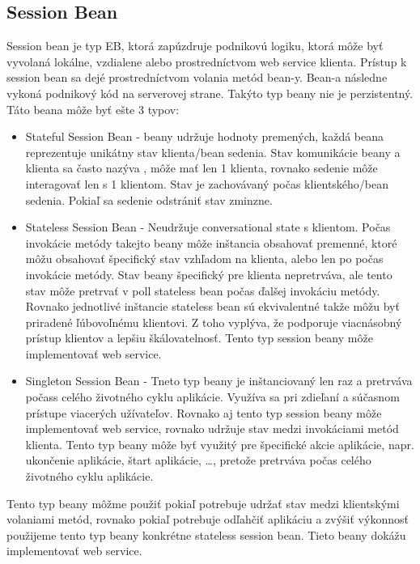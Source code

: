 \subsection{Session Bean}
Session bean je typ EB, ktorá zapúzdruje podnikovú logiku, ktorá môže byť vyvolaná lokálne, vzdialene alebo prostredníctvom web service klienta. Prístup k session bean sa dejé prostredníctvom volania metód bean-y. Bean-a následne vykoná podnikový kód na serverovej strane. Takýto typ beany nie je perzistentný. Táto beana môže byť ešte 3 typov:
\begin{itemize}
\item Stateful Session Bean - beany udržuje hodnoty premených, každá beana reprezentuje unikátny stav klienta/bean sedenia. Stav komunikácie beany a klienta sa často nazýva , môže mať len 1 klienta, rovnako sedenie môže interagovať len s 1 klientom. Stav je zachovávaný počas klientského/bean sedenia. Pokiaľ sa sedenie odstrániť stav zminzne.
\item Stateless Session Bean - Neudržuje conversational state s klientom. Počas invokácie metódy takejto beany môže inštancia obsahovať premenné, ktoré môžu obsahovať špecifický stav vzhľadom na klienta, alebo len po počas invokácie metódy. Stav beany špecifický pre klienta nepretrváva, ale tento stav môže pretrvať v poll stateless bean počas ďalšej invokáciu metódy. Rovnako jednotlivé inštancie stateless bean sú ekvivalentné takže môžu byť priradené ľúbovoľnému klientovi. Z toho vyplýva, že podporuje viacnásobný prístup klientov a lepšiu škálovatelnosť. Tento typ session beany môže implementovať web service.
\item Singleton Session Bean - Tneto typ beany je inštanciovaný len raz a pretrváva počass celého životného cyklu aplikácie. Využíva sa pri zdieľaní a súčasnom prístupe viacerých užívateľov. Rovnako aj tento typ session beany môže implementovať web service, rovnako udržuje stav medzi invokáciami metód klienta. Tento typ beany môže byť využitý pre špecifické akcie aplikácie, napr. ukončenie aplikácie, štart aplikácie, \ldots, pretože pretrváva počas celého životného cyklu aplikácie.
\end{itemize}

Tento typ beany môžme použiť pokiaľ potrebuje udržať stav medzi klientskými volaniami metód, rovnako pokiaľ potrebuje odľahčiť aplikáciu a zvýšiť výkonnosť použijeme tento typ beany konkrétne stateless session bean. Tieto beany dokážu implementovať web service.

